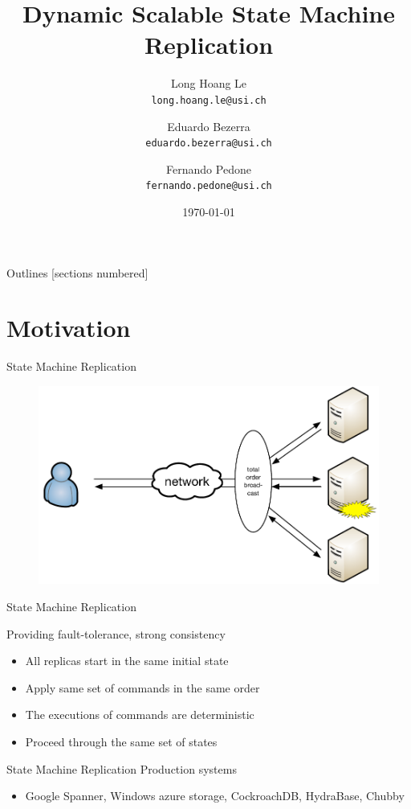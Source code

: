 \documentclass[10pt]{beamer}
\title{Dynamic Scalable State Machine Replication}
\date{\today}
\author{
  Long Hoang Le\\
  \texttt{long.hoang.le@usi.ch}\\
  \and
  Eduardo Bezerra\\
  \texttt{eduardo.bezerra@usi.ch}\\
  \and
  Fernando Pedone\\
  \texttt{fernando.pedone@usi.ch}}
\institute{University of Lugano, Switzerland}
\begin{document}
\maketitle

\begin{frame}{Outlines}
  [sections numbered]
  \tableofcontents[hideallsubsections]
\end{frame}

\section{Motivation}

\begin{frame}[fragile]{State Machine Replication}

  \begin{figure}
    \includegraphics[width=.8\textwidth]{figures/smr-3}
  \end{figure}
\end{frame}

\begin{frame}[fragile]{State Machine Replication}

  Providing fault-tolerance, strong consistency
  \begin{itemize}
    \item All replicas start in the same initial state
    \item Apply same set of commands in the same order 
    \item The executions of commands are deterministic
    \item Proceed through the same set of states
  \end{itemize}
\end{frame}

\begin{frame}[fragile]{State Machine Replication}
  Production systems
    \begin{itemize}
      \item Google Spanner, Windows azure storage, CockroachDB, HydraBase, Chubby
    \end{itemize}
\end{frame}
\end{document}

